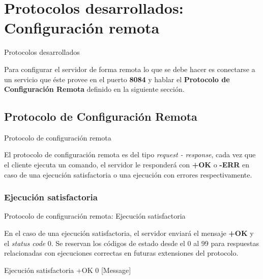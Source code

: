 \documentclass{beamer}
\begin{document}
\section{Protocolos desarrollados: Configuración remota}

\begin{frame}{Protocolos desarrollados}

\par Para configurar el servidor de forma remota lo que se debe hacer es conectarse a un servicio que éste provee en el puerto \textbf{8084} y hablar el \textbf{Protocolo de Configuración Remota} definido en la siguiente sección.

\end{frame}

\subsection{Protocolo de Configuración Remota}

\begin{frame}{Protocolo de configuración remota}

\par El protocolo de configuración remota es del tipo \textit{request - response}, cada vez que el cliente ejecuta un comando, el servidor le responderá con \textbf{+OK} o \textbf{-ERR} en caso de una ejecución satisfactoria o una ejecución con errores respectivamente.

\end{frame}


\subsubsection{Ejecución satisfactoria}

\begin{frame}{Protocolo de configuración remota: Ejecución satisfactoria}

\par En el caso de una ejecución satisfactoria, el servidor enviará el mensaje \textbf{+OK} y el \textit{status code} 0. Se reservan los códigos de estado desde el 0 al 99 para respuestas relacionadas con ejecuciones correctas en futuras extensiones del protocolo.

\begin{block}{Ejecución satisfactoria}
+OK 0 [Message]
\end{block}

\end{frame}
\end{document}

